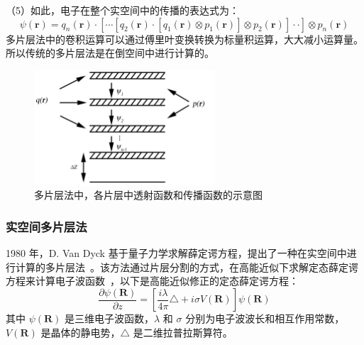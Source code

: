 （5）如此，电子在整个实空间中的传播的表达式为：
\begin{equation}\psi(\boldsymbol{r})=q_{n}(\boldsymbol{r}) \cdot\left[\cdots\left[q_{2}(\boldsymbol{r}) \cdot\left[q_{1}(\boldsymbol{r}) \otimes p_{1}(\boldsymbol{r})\right] \otimes p_{2}(\boldsymbol{r})\right] \cdot \cdot\right] \otimes p_{n}(\boldsymbol{r})\end{equation}
多片层法中的卷积运算可以通过傅里叶变换转换为标量积运算，大大减小运算量。所以传统的多片层法是在倒空间中进行计算的。
\begin{figure}[htbp]
	\vspace{\baselineskip}
	\centering
	\includegraphics[width=0.6\textwidth]{../1.4/14}
	\caption{多片层法中，各片层中透射函数和传播函数的示意图}\label{fig:14}
\end{figure}
\subsubsection{实空间多片层法}
1980 年，D. Van Dyck 基于量子力学求解薛定谔方程，提出了一种在实空间中进行计算的多片层法~\cite{VanDyck1980}。该方法通过片层分割的方式，在高能近似下求解定态薛定谔方程来计算电子波函数~\cite{Coene1984,VanDyck1984,Coene1984-1}，以下是高能近似修正的定态薛定谔方程：
\begin{equation}
\frac{\partial \psi (\boldsymbol{R})}{\partial z} = \left[ \frac{i\lambda}{4\pi}\triangle + i\sigma V(\boldsymbol{R}) \right] \psi (\boldsymbol{R}) 
\end{equation}
其中 $\psi (\boldsymbol{R})$ 是三维电子波函数，$\lambda$ 和 $\sigma$ 分别为电子波波长和相互作用常数，$V(\boldsymbol{R})$ 是晶体的静电势，$\triangle$ 是二维拉普拉斯算符。

